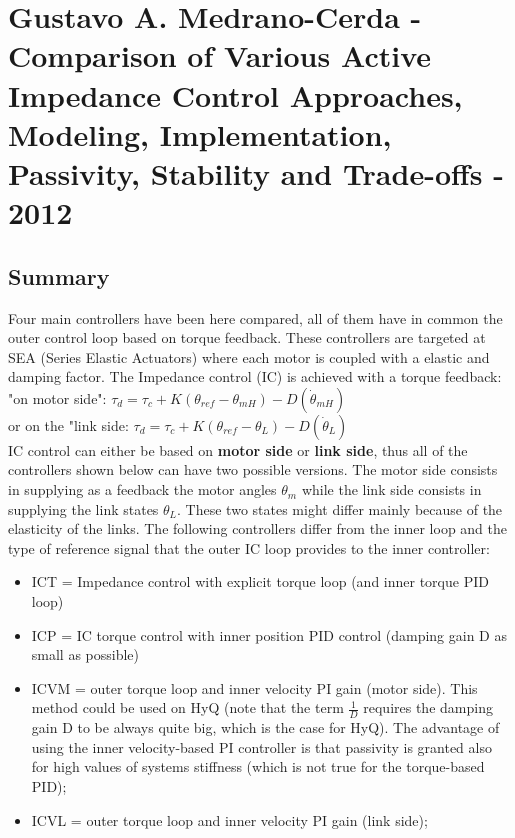 \section{Gustavo A. Medrano-Cerda - Comparison of Various Active Impedance Control Approaches, Modeling, Implementation, Passivity, Stability and Trade-offs - 2012}
\subsection*{Summary}
Four main controllers have been here compared, all of them have in common the outer control loop based on torque feedback. These controllers are targeted at SEA (Series Elastic Actuators) where each motor is coupled with a elastic and damping factor. The Impedance control (IC) is achieved with a torque feedback:\\ "on motor side": $ \tau_d = \tau_c + K (\theta_{ref}-\theta_{mH}) - D(\dot{\theta}_{mH})$\\ or on the "link side: $ \tau_d = \tau_c + K (\theta_{ref}-\theta_{L}) - D(\dot{\theta}_{L})$\\
IC control can either be based on \textbf{motor side} or \textbf{link side}, thus all of the controllers shown below can have two possible versions. The motor side consists in supplying as a feedback the motor angles $\theta_m$ while the link side consists in supplying the link states $\theta_L$. These two states might differ mainly because of the elasticity of the links. The following controllers differ from the inner loop and the type of reference signal that the outer IC loop provides to the inner controller:
\begin{itemize}
\item ICT = Impedance control with explicit torque loop (and inner torque PID loop)
\item ICP = IC torque control with inner position PID control (damping gain D as small as possible)
\item ICVM = outer torque loop and inner velocity PI gain (motor side). This method could be used on HyQ (note that the term $\frac{1}{D}$ requires the damping gain D to be always quite big, which is the case for HyQ). The advantage of using the inner velocity-based PI controller is that passivity is granted also for high values of systems stiffness (which is not true for the torque-based PID);
\item ICVL = outer torque loop and inner velocity PI gain (link side);
\end{itemize}
